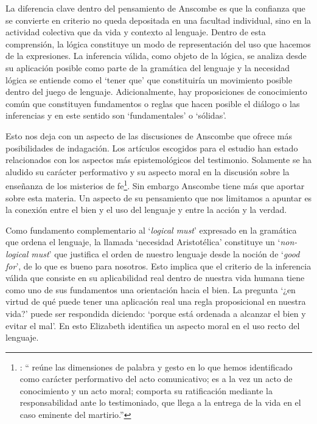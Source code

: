 La diferencia clave dentro del pensamiento de Anscombe es que la confianza que se convierte en criterio no queda depositada en una facultad individual, sino en la actividad colectiva que da vida y contexto al lenguaje. Dentro de esta comprensión, la lógica constituye un modo de representación del uso que hacemos de la expresiones. La inferencia válida, como objeto de la lógica, se analiza desde su aplicación posible como parte de la gramática del lenguaje y la necesidad lógica se entiende como el `tener que' que constituiría un movimiento posible dentro del juego de lenguaje. Adicionalmente, hay proposiciones de conocimiento común que constituyen fundamentos o reglas que hacen posible el diálogo o las inferencias y en este sentido son `fundamentales' o `sólidas'.

Esto nos deja con un aspecto de las discusiones de Anscombe que ofrece más posibilidades de indagación. Los artículos escogidos para el estudio han estado relacionados con los aspectos más epistemológicos del testimonio. Solamente se ha aludido su carácter performativo y su aspecto moral en la discusión sobre la enseñanza de los misterios de fe\footnote{\Cite[Cf.][450]{prades2015testimonio}: \enquote{ reúne las dimensiones de palabra y gesto en lo que hemos identificado como carácter performativo del acto comunicativo; es a la vez un acto de conocimiento y un acto moral; comporta su ratificación mediante la responsabilidad ante lo testimoniado, que llega a la entrega de la vida en el caso eminente del martirio.}}. Sin embargo Anscombe tiene más que aportar sobre esta materia. Un aspecto de su pensamiento que nos limitamos a apuntar es la conexión entre el bien y el uso del lenguaje y entre la acción y la verdad.

Como fundamento complementario al `\emph{logical must}' expresado en la gramática que ordena el lenguaje, la llamada `necesidad Aristotélica' constituye un `\emph{non-logical must}' que justifica el orden de nuestro lenguaje desde la noción de `\emph{good for}', de lo que es bueno para nosotros. Esto implica que el criterio de la inferencia válida que consiste en su aplicabilidad real dentro de nuestra vida humana tiene como uno de sus fundamentos una orientación hacia el bien. La pregunta \enquote*{¿en virtud de qué puede tener una aplicación real una regla proposicional en nuestra vida?} puede ser respondida diciendo: \enquote*{porque está ordenada a alcanzar el bien y evitar el mal}. En esto Elizabeth identifica un aspecto moral en el uso recto del lenguaje.

